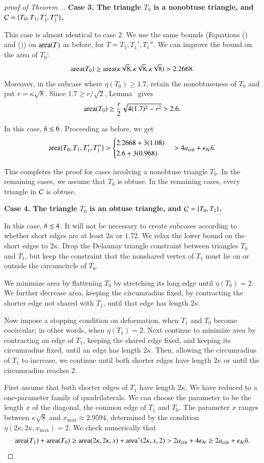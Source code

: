 \begin{proof}[proof of Theorem~.]
{\bf Case 3. The triangle $T_0$ is a nonobtuse triangle, and
  $\mathcal C=\{T_0,T_1,T_1',T_1''\}$.}

This case is almost identical to case 2.  We use the same bounds
(Equations () and ()) on ${\operatorname{area}}(T)$ as
before, for $T = T_1, T_1', T_1''$.  We can improve the bound on the
area of $T_0$:
\[
{\operatorname{area}}(T_0) 
\ge {\operatorname{area}}(\kappa\sqrt{8},\kappa\sqrt{8},\kappa\sqrt{8}) > 2.2668.
\]
Moreover, in the subcase where $\eta(T_0)\ge1.7$, retain the
nonobtuseness of $T_0$ and put $r=\kappa\sqrt8$.
Since $1.7\ge r/\sqrt2$, Lemma~
gives
\[
{\operatorname{area}}(T_0)\ge\frac r2\sqrt{4(1.7)^2-r^2}>2.6.
\]

In this case, $\bar n\le 6$.  Proceeding as before, we get
\[
{\operatorname{area}}\{T_0,T_1,T_1',T_1''\} > 
\begin{cases}
2.2668 + 3 (1.08) \\
2.6 + 3(0.968)
\end{cases}
> 4a_\text{crit} +  \epsilon_{\mathcal N} \bar n.
\] 

This completes the proof for cases involving a nonobtuse triangle
$T_0$.  In the remaining cases, we assume that $T_0$ is obtuse.  
In the remaining cases, every triangle in $\mathcal C$ is obtuse.

{\bf Case 4. The triangle $T_0$ is an obtuse triangle, and
  $\mathcal C=\{T_0,T_1\}$.}

In this case, $\bar n\le 4$.  It will not be necessary to create subcases
according to whether short edges are at least $2\kappa$ or $1.72$.  We
relax the lower bound on the short edges to
$2\kappa$. %
Drop the Delaunay triangle constraint between triangles $T_0$ and $T_1$,
but keep the constraint that the nonshared vertex of $T_1$ must lie on
or outside the circumcircle of $T_0$. 

We minimize area by flattening $T_0$ by stretching its long edge until
$\eta(T_0)=2$.  We further decrease area, keeping the circumradius
fixed, by contracting the shorter edge not shared with $T_1$, until
that edge has length $2\kappa$.

Now impose a stopping condition on deformation, when $T_1$ and $T_0$ become
cocircular; in other words, when $\eta(T_1)=2$.
Next continue to minimize area by contracting an edge of $T_1$, keeping
the shared edge fixed, and
keeping its circumradius fixed, until an edge has length $2\kappa$.
Then, allowing the circumradius of $T_1$ to increase, we continue until
both shorter edges have length $2\kappa$ or until the circumradius
reaches $2$.

First assume that both shorter edges of $T_1$ have length $2\kappa$.
We have reduced to a one-parameter family of quadrilaterals.  We can
choose the parameter to be the length $x$ of the diagonal, the common
edge of $T_1$ and $T_0$.  The parameter $x$ ranges between
$\kappa\sqrt{8}$ and $x_{\max}\approx 2.9594$, determined by the
condition $\eta(2\kappa,2\kappa,x_{\max}) = 2$.  We check numerically
that
\[
{\operatorname{area}}(T_1) + {\operatorname{area}}(T_0) \ge {\operatorname{area}}(2\kappa,2\kappa,x) +
{\operatorname{area}}^\circ(2\kappa,x,2) > 2a_\text{crit} + 4 \epsilon_{\mathcal N} \ge 2a_\text{crit} + \epsilon_{\mathcal N} \bar n.
\] 


\end{proof}
